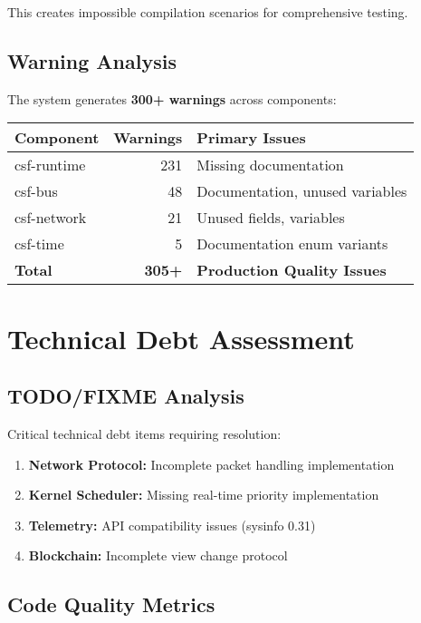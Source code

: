 \documentclass[11pt,a4paper]{article}
\newcommand{\critical}[1]{\textcolor{criticalred}{\textbf{#1}}}
\begin{document}
This creates impossible compilation scenarios for comprehensive testing.

\subsection{Warning Analysis}

The system generates \critical{300+ warnings} across components:

\begin{center}
\begin{tabular}{|l|r|l|}
\hline
\textbf{Component} & \textbf{Warnings} & \textbf{Primary Issues} \\
\hline
csf-runtime & 231 & Missing documentation \\
csf-bus & 48 & Documentation, unused variables \\
csf-network & 21 & Unused fields, variables \\
csf-time & 5 & Documentation enum variants \\
\hline
\textbf{Total} & \textbf{305+} & \textbf{Production Quality Issues} \\
\hline
\end{tabular}
\end{center}

\section{Technical Debt Assessment}

\subsection{TODO/FIXME Analysis}

Critical technical debt items requiring resolution:

\begin{enumerate}
    \item \textbf{Network Protocol:} Incomplete packet handling implementation
    \item \textbf{Kernel Scheduler:} Missing real-time priority implementation
    \item \textbf{Telemetry:} API compatibility issues (sysinfo 0.31)
    \item \textbf{Blockchain:} Incomplete view change protocol
\end{enumerate}

\subsection{Code Quality Metrics}
\end{document}
